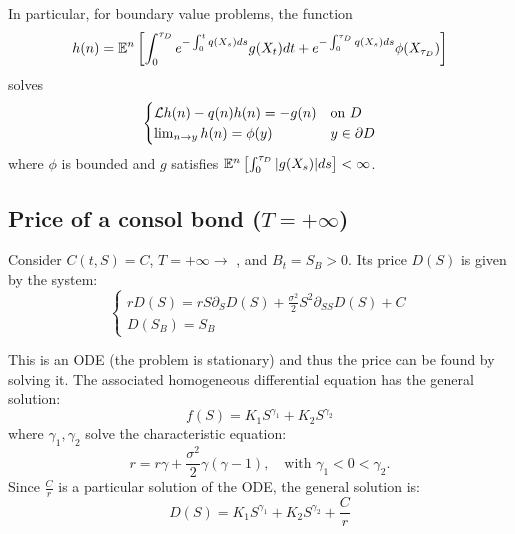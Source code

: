 In particular, for boundary value problems, the function
\begin{equation*}
    h(n) = \mathbb E^n \left[ \int_0^{\tau_D} e^{-\int_0^t q(X_s) ds} g(X_t) dt + e^{-\int_0^{\tau_D} q(X_s) ds} \phi(X_{\tau_D}) \right]
\end{equation*}
solves
\begin{equation*}
    \begin{cases}
        \mathcal{L}h(n) - q(n)h(n) = -g(n) & \text{on } D \\
        \lim_{n \to y} h(n) = \phi(y) & y \in \partial D
    \end{cases}
\end{equation*}
where $\phi$ is bounded and $g$ satisfies $\mathbb E^n \left[ \int_0^{\tau_D} |g(X_s)| ds \right] < \infty$.


\subsection*{\color{red}Price of a consol bond ($T = +\infty$)}

Consider $C(t, S) = C$, $T = +\infty \rightarrow$ , and $B_t = S_B > 0$. Its price $D(S)$ is given by the system:
\begin{equation*}
    \begin{cases}
        rD(S) = rS\partial_S D(S) + \frac{\sigma^2}{2} S^2 \partial_{SS} D(S) + C \\
        D(S_B) = S_B
    \end{cases}
\end{equation*}

{\color{red}This is an ODE (the problem is stationary)} and thus the price can be found by solving it. The associated homogeneous differential equation has the general solution:
\begin{equation*}
    f(S) = K_1 S^{\gamma_1} + K_2 S^{\gamma_2}
\end{equation*}
where $\gamma_1, \gamma_2$ solve the characteristic equation:
\begin{equation*}
    r = r\gamma + \frac{\sigma^2}{2} \gamma(\gamma - 1), \quad \text{with } \gamma_1 < 0 < \gamma_2.
\end{equation*}
Since $\frac{C}{r}$ is a particular solution of the ODE, the general solution is:
\begin{equation*}
    D(S) = K_1 S^{\gamma_1} + K_2 S^{\gamma_2} + \frac{C}{r}
\end{equation*}


